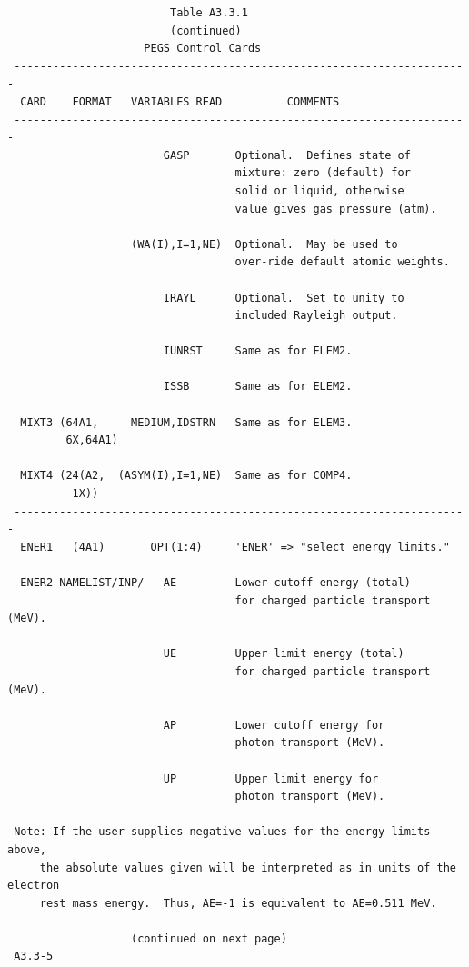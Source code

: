 \newpage {} \begin{verbatim}
                         Table A3.3.1
                         (continued)
                     PEGS Control Cards
 ----------------------------------------------------------------------
  CARD    FORMAT   VARIABLES READ          COMMENTS
 ----------------------------------------------------------------------
                        GASP       Optional.  Defines state of
                                   mixture: zero (default) for
                                   solid or liquid, otherwise
                                   value gives gas pressure (atm).

                   (WA(I),I=1,NE)  Optional.  May be used to
                                   over-ride default atomic weights.

                        IRAYL      Optional.  Set to unity to
                                   included Rayleigh output.

                        IUNRST     Same as for ELEM2.

                        ISSB       Same as for ELEM2.

  MIXT3 (64A1,     MEDIUM,IDSTRN   Same as for ELEM3.
         6X,64A1)

  MIXT4 (24(A2,  (ASYM(I),I=1,NE)  Same as for COMP4.
          1X))
 ----------------------------------------------------------------------
  ENER1   (4A1)       OPT(1:4)     'ENER' => "select energy limits."

  ENER2 NAMELIST/INP/   AE         Lower cutoff energy (total)
                                   for charged particle transport (MeV).

                        UE         Upper limit energy (total)
                                   for charged particle transport (MeV).

                        AP         Lower cutoff energy for
                                   photon transport (MeV).

                        UP         Upper limit energy for
                                   photon transport (MeV).

 Note: If the user supplies negative values for the energy limits above,
     the absolute values given will be interpreted as in units of the electron
     rest mass energy.  Thus, AE=-1 is equivalent to AE=0.511 MeV.

                   (continued on next page)
 A3.3-5
\end{verbatim}
